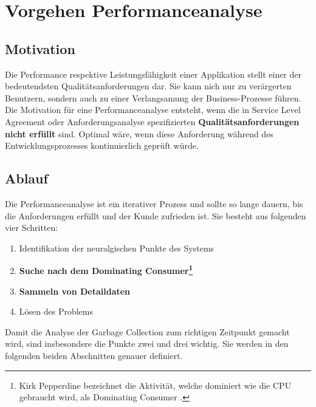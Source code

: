 \chapter{Vorgehen Performanceanalyse}
\section{Motivation}

Die Performance respektive Leistungsfähigkeit einer Applikation stellt einer der bedeutendsten Qualitätsanforderungen dar. Sie kann nich nur zu verärgerten Benutzern, sondern auch zu einer Verlangsamung der Business-Prozesse führen. Die Motivation für eine Performanceanalyse entsteht, wenn die in Service Level Agreement oder Anforderungsanalyse spezifizierten \textbf{Qualitätsanforderungen nicht erfüllt} sind. Optimal wäre, wenn diese Anforderung während des Entwicklungsprozesses kontinuierlich geprüft würde.

\section{Ablauf}
Die Performanceanalyse ist ein iterativer Prozess und sollte so lange dauern, bis die Anforderungen erfüllt und der Kunde zufrieden ist. Sie besteht aus folgenden vier Schritten\cite{hummelBeer201109}:
\begin{enumerate}
	\item Identifikation der neuralgischen Punkte des Systems
	\item \textbf{Suche nach dem Dominating Consumer\footnote{Kirk Pepperdine bezeichnet die Aktivität, welche dominiert wie die CPU gebraucht wird, als Dominating Consumer . }}
	\item \textbf{Sammeln von Detaildaten}
	\item Lösen des Problems
\end{enumerate}


Damit die Analyse der Garbage Collection zum richtigen Zeitpunkt gemacht wird, sind insbesondere die Punkte zwei und drei wichtig. Sie werden in den folgenden beiden Abschnitten genauer definiert.
